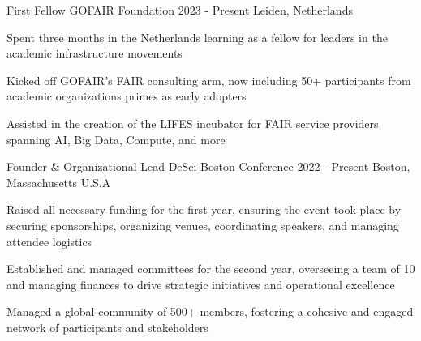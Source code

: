 
\begin{cventries}


  \cventry
    {First Fellow} %
    {GOFAIR Foundation} %
    {2023 - Present} %
    {Leiden, Netherlands} %
    {
      \begin{cvitems} %
        \item {Spent three months in the Netherlands learning as a fellow for leaders in the academic infrastructure movements}
        \item {Kicked off GOFAIR’s FAIR consulting arm, now including 50+ participants from academic organizations primes as early adopters}
        \item {Assisted in the creation of the LIFES incubator for FAIR service providers spanning AI, Big Data, Compute, and more}
      \end{cvitems}
    }

  \cventry
    {Founder \& Organizational Lead} %
    {DeSci Boston Conference} %
    {2022 - Present} %
    {Boston, Massachusetts U.S.A} %
    {
      \begin{cvitems} %
        \item Raised all necessary funding for the first year, ensuring the event took place by securing sponsorships, organizing venues, coordinating speakers, and managing attendee logistics
        \item Established and managed committees for the second year, overseeing a team of 10 and managing finances to drive strategic initiatives and operational excellence
        \item Managed a global community of 500+ members, fostering a cohesive and engaged network of participants and stakeholders
      \end{cvitems}
    }


\end{cventries}
